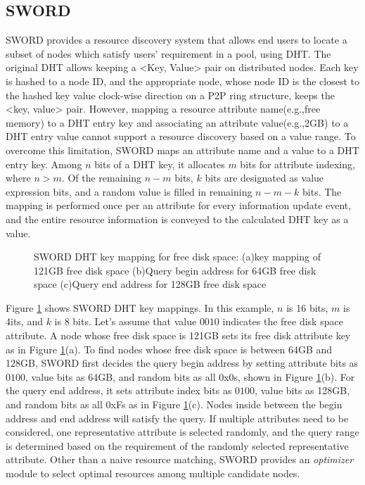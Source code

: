 \documentclass{acm_proc_article-sp}
\begin{document}
\subsection{SWORD}
SWORD provides a resource discovery system that allows end users to locate a subset of nodes which satisfy users' requirement in a pool, using DHT.
The original DHT allows keeping a <Key, Value> pair on distributed nodes. 
Each key is hashed to a node ID, and the appropriate node, whose node ID is the closest to the hashed key value clock-wise direction on a P2P ring structure\cite{chord}\cite{pastry}, keeps the <key, value> pair. 
However, mapping a resource attribute name(e.g.,free memory) to a DHT entry key and associating an attribute value(e.g.,2GB) to a DHT entry value cannot support a resource discovery based on a value range. 
To overcome this limitation, SWORD maps an attribute name and a value to a DHT entry key. Among $n$ bits of a DHT key, it allocates $m$ bits for attribute indexing, where $n>m$. 
Of the remaining $n-m$ bits, $k$ bits are designated as value expression bits, and a random value is filled in remaining $n-m-k$ bits.
The mapping is performed once per an attribute for every information update event, and the entire resource information is conveyed to the calculated DHT key as a value.
\begin{figure}
\centering
{}
\caption{\label{fig:sword}SWORD DHT key mapping for free disk space: (a)key mapping of 121GB free disk space (b)Query begin address for 64GB free disk space (c)Query end address for 128GB free disk space}
\end{figure}
Figure \ref{fig:sword} shows SWORD DHT key mappings. In this example, $n$ is 16 bits, $m$ is 4its, and $k$ is 8 bits. Let's assume that value $0010$ indicates the free disk space attribute.
A node whose free disk space is 121GB sets its free disk attribute key as in Figure \ref{fig:sword}(a).
To find nodes whose free disk space is between 64GB and 128GB, SWORD first decides the query begin address by setting attribute bits as $0100$, value bits as 64GB, and random bits as all 0x0s, shown in Figure \ref{fig:sword}(b).
For the query end address, it sets attribute index bits as $0100$, value bits as 128GB, and random bits as all 0xFs as in Figure \ref{fig:sword}(c).
Nodes inside between the begin address and end address will satisfy the query. 
If multiple attributes need to be considered, one representative attribute is selected randomly, and the query range is determined based on the requirement of the randomly selected representative attribute.
Other than a naive resource matching, SWORD provides an \textit{optimizer} module to select optimal resources among multiple candidate nodes. 
\end{document}
